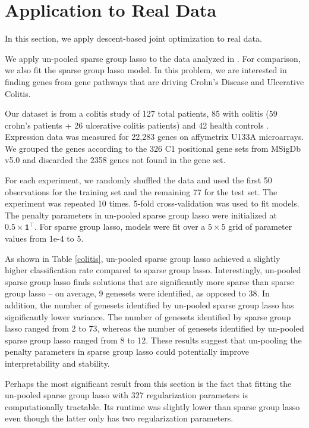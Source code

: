 \documentclass[10pt,letterpaper]{article}
\begin{document}
\section{Application to Real Data}
In this section, we apply descent-based joint optimization to real data.

We apply un-pooled sparse group lasso to the data analyzed in \citet{simon2013sparse}. For comparison, we also fit the sparse group lasso model. In this problem, we are interested in finding genes from gene pathways that are driving Crohn's Disease and Ulcerative Colitis.

Our dataset is from a colitis study of 127 total patients, 85 with colitis (59 crohn's patients + 26 ulcerative colitis patients) and 42 health controls \citep{burczynski2006molecular}. Expression data was measured for 22,283 genes on affymetrix U133A microarrays. We grouped the genes according to the 326 C1 positional gene sets from MSigDb v5.0 \citep{subramanian2005gene} and discarded the 2358 genes not found in the gene set.

For each experiment, we randomly shuffled the data and used the first 50 observations for the training set and the remaining 77 for the test set. The experiment was repeated 10 times. 5-fold cross-validation was used to fit models. The penalty parameters in un-pooled sparse group lasso were initialized at $0.5 \times \boldsymbol 1^\top$. For sparse group lasso, models were fit over a $5 \times 5$ grid of parameter values from 1e-4 to 5.

As shown in Table \ref{colitis}, un-pooled sparse group lasso achieved a slightly higher classification rate compared to sparse group lasso. Interestingly, un-pooled sparse group lasso finds solutions that are significantly more sparse than sparse group lasso -- on average, 9 genesets were identified, as opposed to 38. In addition, the number of genesets identified by un-pooled sparse group lasso has significantly lower variance. The number of genesets identified by sparse group lasso ranged from 2 to 73, whereas the number of genesets identified by un-pooled sparse group lasso ranged from 8 to 12. These results suggest that un-pooling the penalty parameters in sparse group lasso could potentially improve interpretability and stability.

Perhaps the most significant result from this section is the fact that fitting the un-pooled sparse group lasso with 327 regularization parameters is computationally tractable. Its runtime was slightly lower than sparse group lasso even though the latter only has two regularization parameters.
\end{document}

